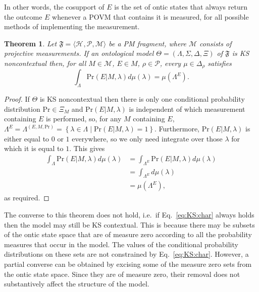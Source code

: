 \documentclass[DIV=calc,fontsize=12pt]{scrartcl} %
\theoremstyle{definition}
\theoremstyle{plain}
\newtheorem{theorem}[definition]{Theorem}
\newcommand{\Hilb}[1][]{\ensuremath{\mathcal{H}_{#1}}}
\begin{document}
In other words, the cosupport of $E$ is the set of ontic states that
always return the outcome $E$ whenever a POVM that contains it is
measured, for all possible methods of implementing the measurement.

\begin{theorem}
\label{prop:KS:char}
Let $\mathfrak{F} = \langle \Hilb, \mathcal{P}, \mathcal{M} \rangle$
be a PM fragment, where $\mathcal{M}$ consists of projective
measurements.  If an ontological model $\Theta = (\Lambda, \Sigma,
\Delta, \Xi)$ of $\mathfrak{F}$ is KS noncontextual then, for all $M
\in \mathcal{M}$, $E \in M$, $\rho \in \mathcal{P}$, every $\mu \in
\Delta_{\rho}$ satisfies
\begin{equation}
\label{eq:KS:char}
\int_{\Lambda} \mathrm{Pr}(E|M,\lambda) d\mu(\lambda) = \mu(\Lambda^E).
\end{equation}
\end{theorem}
\begin{proof}
If $\Theta$ is KS noncontextual then there is only one conditional
probability distribution $\text{Pr} \in \Xi_M$ and
$\text{Pr}(E|M,\lambda)$ is independent of which measurement
containing $E$ is performed, so, for any $M$ containing $E$,
$\Lambda^E = \Lambda^{(E,M,\text{Pr})} = \left \{ \lambda \in
\Lambda \middle | \text{Pr}(E|M,\lambda) = 1 \right \}$.
Furthermore, $\text{Pr}(E|M,\lambda)$ is either equal to $0$ or $1$
everywhere, so we only need integrate over those $\lambda$ for which
it is equal to $1$.  This gives
\begin{align}
\int_{\Lambda} \text{Pr}(E|M,\lambda) d \mu(\lambda) & =
\int_{\Lambda^E} \text{Pr}(E|M,\lambda) d \mu(\lambda) \\
& = \int_{\Lambda^E} d \mu(\lambda) \\
& = \mu(\Lambda^E),
\end{align}
as required.
\end{proof}

The converse to this theorem does not hold, i.e.\ if
Eq.~\eqref{eq:KS:char} always holds then the model may still be KS
contextual.  This is because there may be subsets of the ontic state
space that are of measure zero according to all the probability
measures that occur in the model.  The values of the conditional
probability distributions on these sets are not constrained by
Eq.~\eqref{eq:KS:char}.  However, a partial converse can be obtained
by excising some of the measure zero sets from the ontic state space.
Since they are of measure zero, their removal does not substantively
affect the structure of the model.
\end{document}

